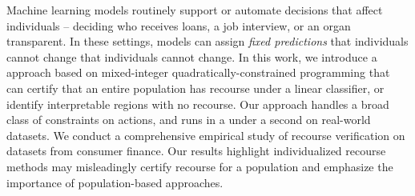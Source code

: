 

Machine learning models routinely support or automate decisions that affect individuals -- deciding who receives loans, a job interview, or an organ transparent. In these settings, models can assign \emph{fixed predictions} that individuals cannot change that individuals cannot change. 
%
%
In this work, we introduce a approach based on mixed-integer quadratically-constrained programming that can certify that an entire population has recourse under a linear classifier, or identify interpretable regions with no recourse. Our approach handles a broad class of constraints on actions, and runs in a under a second on real-world datasets. 
%
We conduct a comprehensive empirical study of recourse verification on datasets from consumer finance. Our results highlight individualized recourse methods may misleadingly certify recourse for a population and emphasize the importance of population-based approaches.

